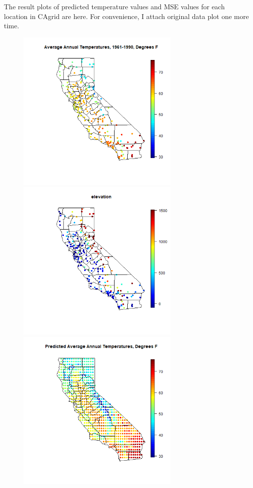 \documentclass{article}
\begin{document}
\clearpage
The result plots of predicted temperature values and MSE values for each location in CAgrid are here.
For convenience, I attach original data plot one more time.

\begin{figure}[!h]
    \includegraphics[height=8cm]{prob2_CAtemp_avgtemp.png} 
    \includegraphics[height=8cm]{prob2_CAtemp_elevation.png} \\
    \includegraphics[height=8cm]{prob2_CAgrid_predicted_mean.png}

\end{figure}
\end{document}
